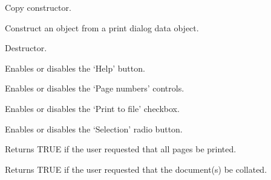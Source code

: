 
Copy constructor.


Construct an object from a print dialog data object.



Destructor.

\label{wxprintdialogdataenablehelp}


Enables or disables the `Help' button.

\label{wxprintdialogdataenablepagenumbers}


Enables or disables the `Page numbers' controls.

\label{wxprintdialogdataenableprinttofile}


Enables or disables the `Print to file' checkbox.

\label{wxprintdialogdataenableselection}


Enables or disables the `Selection' radio button.

\label{wxprintdialogdatagetallpages}


Returns TRUE if the user requested that all pages be printed.

\label{wxprintdialogdatagetcollate}


Returns TRUE if the user requested that the document(s) be collated.

\label{wxprintdialogdatagetfrompage}


